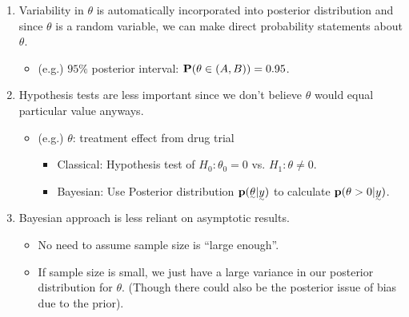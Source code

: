 \begin{enumerate}
    \item Variability in $\theta$ is automatically incorporated into posterior distribution and since $\theta$ is a random variable, we can make direct probability statements about $\theta$.
    \begin{itemize}
        \item (e.g.) $95\%$ posterior interval: $\P(\theta \in (A, B)) = 0.95$.
    \end{itemize}
    \item Hypothesis tests are less important since we don't believe $\theta$ would equal particular value anyways.
    \begin{itemize}
        \item (e.g.) $\theta$: treatment effect from drug trial
        \begin{itemize}
            \item Classical: Hypothesis test of $H_0: \theta_0 = 0$ vs. $H_1: \theta \neq 0$.
            \item Bayesian: Use Posterior distribution $\p(\vec{\theta} | \vec{y})$ to calculate $\p(\theta > 0 | \vec{y})$.
        \end{itemize}
    \end{itemize}
    \item Bayesian approach is less reliant on asymptotic results.
    \begin{itemize}
        \item No need to assume sample size is ``large enough''.
        \item If sample size is small, we just have a large variance in our posterior distribution for $\theta$. (Though there could also be the posterior issue of bias due to the prior).
    \end{itemize}
\end{enumerate}

